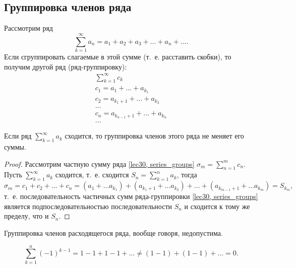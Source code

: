 \documentclass[../../main.tex]{subfiles}
\begin{document}
\subsection{Группировка членов ряда}
Рассмотрим ряд
\[\sum\limits_{k = 1}^{\infty} a_n = a_1 + a_2 + a_3 + \ldots + a_n + \ldots.\]
Если сгруппировать слагаемые в этой сумме (т.~е. расставить скобки), то получим
другой ряд (ряд-группировку):
\begin{equation}
\begin{gathered}
	\label{lec30, series_groups}
	\sum\limits_{k = 1}^{\infty} c_k \\
	c_1 = a_1 + \ldots + a_{k_1} \\
	c_2 = a_{k_1+1} + \ldots + a_{k_2} \\
	\ldots \\
	c_n = a_{k_{n-1}+1} + \ldots + a_{k_n} \\
	\ldots
\end{gathered}
\end{equation}
\begin{thm}
	Если ряд $\sum\limits_{k = 1}^{\infty} a_k$ сходится,
	то группировка членов этого ряда не меняет его суммы.
\end{thm}
\begin{proof}
Рассмотрим частную сумму ряда \eqref{lec30, series_groups}
$\sigma_m = \sum\limits_{n = 1}^{m} c_n$.
Пусть $\sum\limits_{k = 1}^{\infty} a_k$ сходится, т.~е. сходится
$ S_n = \sum\limits_{k = 1}^{n} a_k$, тогда
\[\sigma_m = c_1 + c_2 + \ldots + c_n = (a_1 + \ldots a_{k_1}) +
(a_{k_1 + 1} + \ldots a_{k_2}) +
\ldots + (a_{k_{m-1} + 1} + \ldots a_{k_m}) = S_{k_m},\]
т.~е. последовательность частичных сумм ряда-группировки
\eqref{lec30, series_groups} является подпоследовательностью
последовательности $S_n$ и сходится к тому же пределу, что и $S_n$.
\end{proof}
Группировка членов расходящегося ряда, вообще говоря, недопустима.
\begin{example}
	\[\sum\limits_{k = 1}^{n} (-1)^{k - 1} = 1 - 1 + 1 - 1  + \ldots \neq
	(1 - 1) + (1 - 1) + \ldots = 0.\]
\end{example}
\end{document}
